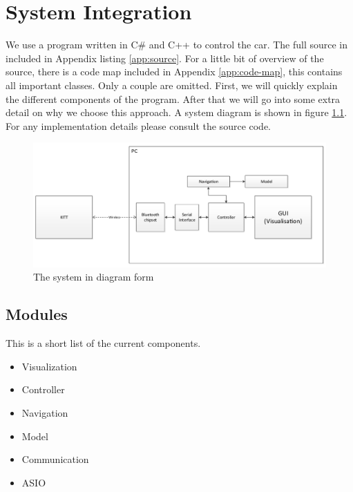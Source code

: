 \documentclass[final]{scrreprt} %
\begin{document}
\chapter{System Integration}
\label{ch:system-integration}
We use a program written in C\# and C++ to control the car.
The full source in included in Appendix listing \ref{app:source}.
For a little bit of overview of the source, there is a code map included in Appendix \ref{app:code-map}, this contains all important classes.
Only a couple are omitted.
First, we will quickly explain the different components of the program.
After that we will go into some extra detail on why we choose this approach.
A system diagram is shown in figure \ref{fig:system-diagram}.
For any implementation details please consult the source code.
\begin{figure}[H]
	\centering    	
    	\includegraphics[width=\textwidth]{resources/system-diagram.pdf}
    	\caption{The system in diagram form}
    	\label{fig:system-diagram}
\end{figure}
\section{Modules}
This is a short list of the current components.
\begin{itemize}
\item Visualization
\item Controller
\item Navigation
\item Model
\item Communication
\item ASIO
\end{itemize}
\end{document}
